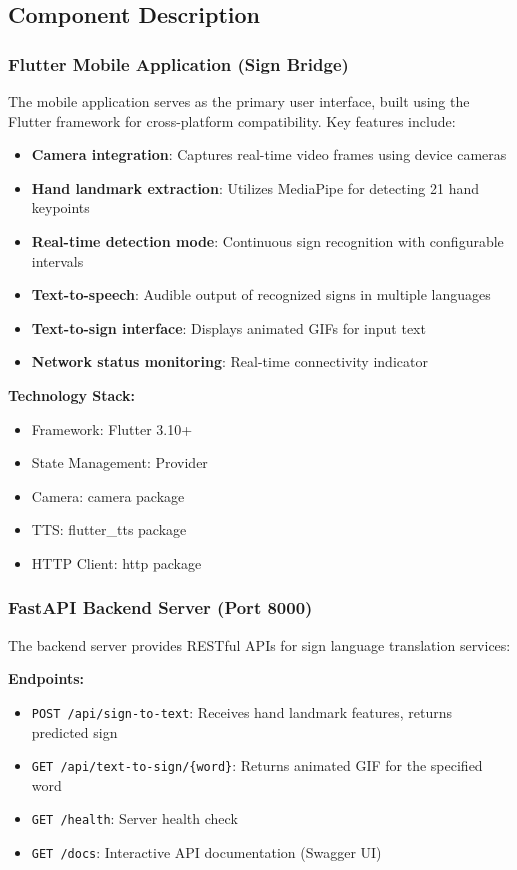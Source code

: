 \documentclass[conference]{IEEEtran}
\begin{document}
\subsection{Component Description}

\subsubsection{Flutter Mobile Application (Sign Bridge)}

The mobile application serves as the primary user interface, built using the Flutter framework for cross-platform compatibility. Key features include:

\begin{itemize}
    \item \textbf{Camera integration}: Captures real-time video frames using device cameras
    \item \textbf{Hand landmark extraction}: Utilizes MediaPipe for detecting 21 hand keypoints
    \item \textbf{Real-time detection mode}: Continuous sign recognition with configurable intervals
    \item \textbf{Text-to-speech}: Audible output of recognized signs in multiple languages
    \item \textbf{Text-to-sign interface}: Displays animated GIFs for input text
    \item \textbf{Network status monitoring}: Real-time connectivity indicator
\end{itemize}

\textbf{Technology Stack:}
\begin{itemize}
    \item Framework: Flutter 3.10+
    \item State Management: Provider
    \item Camera: camera package
    \item TTS: flutter\_tts package
    \item HTTP Client: http package
\end{itemize}

\subsubsection{FastAPI Backend Server (Port 8000)}

The backend server provides RESTful APIs for sign language translation services:

\textbf{Endpoints:}
\begin{itemize}
    \item \texttt{POST /api/sign-to-text}: Receives hand landmark features, returns predicted sign
    \item \texttt{GET /api/text-to-sign/\{word\}}: Returns animated GIF for the specified word
    \item \texttt{GET /health}: Server health check
    \item \texttt{GET /docs}: Interactive API documentation (Swagger UI)
\end{itemize}
\end{document}
